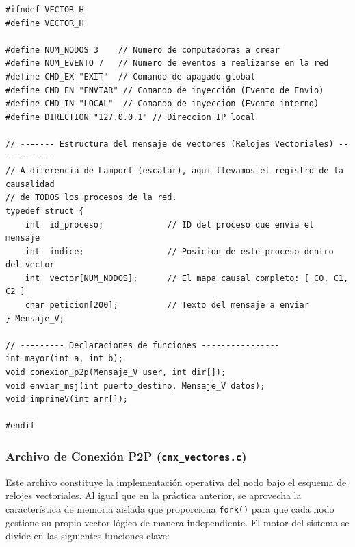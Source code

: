 \begin{lstlisting}[style=estiloC]
#ifndef VECTOR_H
#define VECTOR_H

#define NUM_NODOS 3    // Numero de computadoras a crear
#define NUM_EVENTO 7   // Numero de eventos a realizarse en la red
#define CMD_EX "EXIT"  // Comando de apagado global
#define CMD_EN "ENVIAR" // Comando de inyección (Evento de Envio)
#define CMD_IN "LOCAL"  // Comando de inyeccion (Evento interno)
#define DIRECTION "127.0.0.1" // Direccion IP local

// ------- Estructura del mensaje de vectores (Relojes Vectoriales) ------------
// A diferencia de Lamport (escalar), aqui llevamos el registro de la causalidad 
// de TODOS los procesos de la red.
typedef struct {
    int  id_proceso;             // ID del proceso que envia el mensaje
    int  indice;                 // Posicion de este proceso dentro del vector
    int  vector[NUM_NODOS];      // El mapa causal completo: [ C0, C1, C2 ]
    char peticion[200];          // Texto del mensaje a enviar
} Mensaje_V;

// --------- Declaraciones de funciones ----------------
int mayor(int a, int b);
void conexion_p2p(Mensaje_V user, int dir[]);
void enviar_msj(int puerto_destino, Mensaje_V datos);
void imprimeV(int arr[]);

#endif
\end{lstlisting}

\subsubsection{Archivo de Conexión P2P (\texttt{cnx\_vectores.c})}

Este archivo constituye la implementación operativa del nodo bajo el esquema de relojes vectoriales. Al igual que en la práctica anterior, se aprovecha la característica de memoria aislada que proporciona \texttt{fork()} para que cada nodo gestione su propio vector lógico de manera independiente. El motor del sistema se divide en las siguientes funciones clave:

